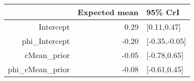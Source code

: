 \begin{tabular}{rrl}
  \hline
 & Expected mean & 95\% CrI \\ 
  \hline
Intercept & 0.29 & [0.11,0.47] \\ 
  phi\_Intercept & -0.20 & [-0.35,-0.05] \\ 
  cMean\_prior & -0.05 & [-0.78,0.65] \\ 
  phi\_cMean\_prior & -0.08 & [-0.61,0.45] \\ 
   \hline
\end{tabular}

